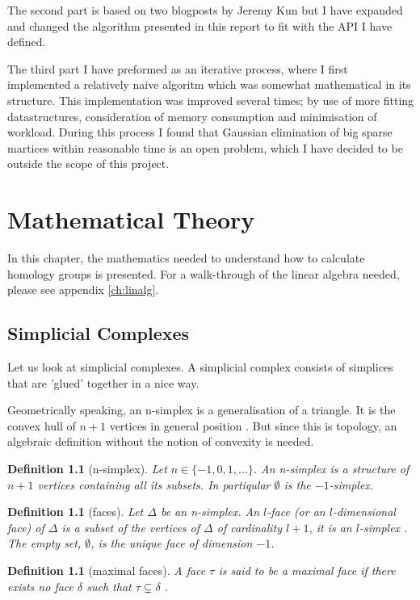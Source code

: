 \documentclass[11pt,a4paper,twoside]{report}
\newtheorem{mydef}[mythm]{Definition}
\begin{document}
The second part is based on two blogposts by Jeremy Kun \cite{KunPrimer}\cite{Kun} but I have expanded and changed the algorithm presented in this report to fit with the API I have defined.

The third part I have preformed as an iterative process, where I first implemented a relatively naive algoritm which was somewhat mathematical in its structure. This implementation was improved several times; by use of more fitting datastructures, consideration of memory consumption and minimisation of workload. During this process I found that Gaussian elimination of big sparse martices within reasonable time is an open problem, which I have decided to be outside the scope of this project.

\chapter{Mathematical Theory} \label{ch:theory}
In this chapter, the mathematics needed to understand how to calculate homology groups is presented. For a walk-through of the linear algebra needed, please see appendix \ref{ch:linalg}.

\section{Simplicial Complexes}
Let us look at simplicial complexes. A simplicial complex consists of simplices that are 'glued' together in a nice way.

Geometrically speaking, an n-simplex is a generalisation of a triangle. It is the convex hull of $n+1$ vertices in general position \cite{Nadathur}. But since this is topology, an algebraic definition without the notion of convexity is needed.

\begin{mydef}[n-simplex]
Let $n\in\{-1,0,1,\dots\}$. An n-simplex is a structure of $n+1$ vertices containing all its subsets. In partiqular $\emptyset$ is the $-1$-simplex.
\end{mydef}

\begin{mydef}[faces]
Let $\Delta$ be an n-simplex. An $l$-face (or an $l$-dimensional face) of $\Delta$ is a subset of the vertices of $\Delta$ of cardinality $l+1$, it is an $l$-simplex \cite{Nadathur}. The empty set, $\emptyset$, is the unique face of dimension $-1$\cite{Allgaier}.
\end{mydef}

\begin{mydef}[maximal faces]
A face $\tau$ is said to be a maximal face if there exists no face $\delta$ such that $\tau \subsetneq \delta$ \cite[p.15]{Jonsson}.
\end{mydef}
\end{document}

